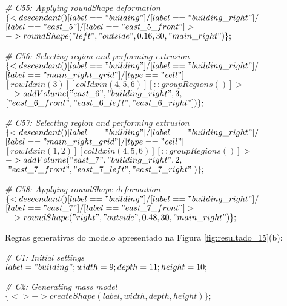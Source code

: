 \noindent \textit{\# C55: Applying roundShape deformation}\\
$\{< descendant() [label=="building"] / [label=="building\_right"] / $\\
$[label=="east\_5"] / [label=="east\_5\_front"] > $\\
$-> roundShape("left", "outside", 0.16, 30, "main\_right")\};$

\noindent \textit{\# C56: Selecting region and performing extrusion}\\
$\{< descendant() [label=="building"] / [label=="building\_right"] / $\\
$[label=="main\_right\_grid"] / [type=="cell"] $\\
$[rowIdx in (3)] [colIdx in (4, 5, 6)] [::groupRegions()] > $\\
$-> addVolume("east\_6", "building\_right", 3, $\\
$["east\_6\_front", "east\_6\_left", "east\_6\_right"])\};$

\noindent \textit{\# C57: Selecting region and performing extrusion}\\
$\{< descendant() [label=="building"] / [label=="building\_right"] / $\\
$[label=="main\_right\_grid"] / [type=="cell"] $\\
$[rowIdx in (1, 2)] [colIdx in (4, 5, 6)] [::groupRegions()] > $\\
$-> addVolume("east\_7", "building\_right", 2, $\\
$["east\_7\_front", "east\_7\_left", "east\_7\_right"])\};$

\noindent \textit{\# C58: Applying roundShape deformation}\\
$\{< descendant() [label=="building"] / [label=="building\_right"] / $\\
$[label=="east\_7"] / [label=="east\_7\_front"] > $\\
$-> roundShape("right", "outside", 0.48, 30, "main\_right")\};$

\vspace{1cm}

Regras generativas do modelo apresentado na Figura \ref{fig:resultado_15}(b):

\noindent \textit{\# C1: Initial settings}\\
$label = "building"; width = 9; depth = 11; height = 10;$

\noindent \textit{\# C2: Generating mass model}\\
$\{<> -> createShape(label, width, depth, height)\};$

